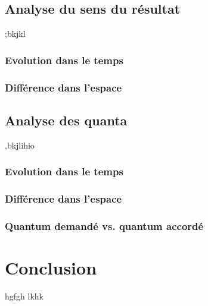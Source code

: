 \subsection{Analyse du sens du résultat}
;bkjkl
\subsubsection{Evolution dans le temps}
\subsubsection{Différence dans l'espace}

\subsection{Analyse des quanta}
,bkjlihio
\subsubsection{Evolution dans le temps}
\subsubsection{Différence dans l'espace}
\subsubsection{Quantum demandé vs. quantum accordé}

\section{Conclusion}
\label{sec:demo:conclusion}
hgfgh
lkhk
